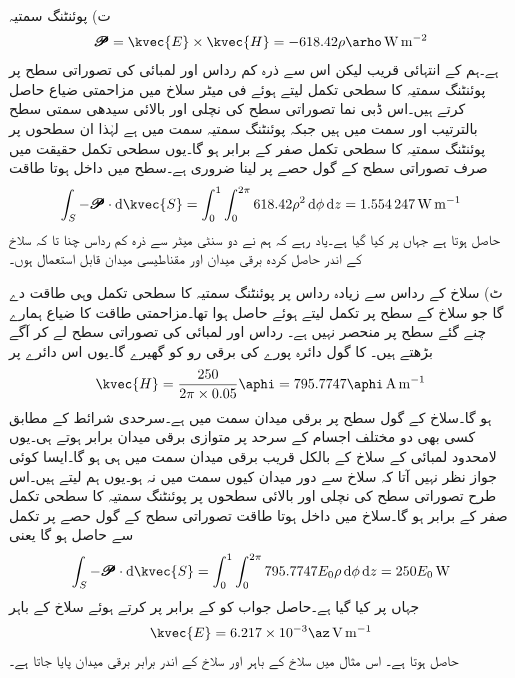 ت) پوئنٹنگ سمتیہ
\begin{align*}
\pmb{\mathscr{P}}=\kvec{E} \times \kvec{H}=-618.42 \rho \arho \, \si{\watt\per\meter\squared}
\end{align*}
 ہے۔ہم  کے انتہائی قریب لیکن اس سے ذرہ کم رداس اور  لمبائی کی تصوراتی سطح پر پوئنٹنگ سمتیہ کا سطحی تکمل لیتے ہوئے فی میٹر سلاخ میں مزاحمتی ضیاع حاصل کرتے ہیں۔اس ڈبی نما تصوراتی سطح کی نچلی اور بالائی سیدھی سمتی سطح بالترتیب  اور  سمت میں ہیں جبکہ پوئنٹنگ سمتیہ  سمت میں ہے لہٰذا ان سطحوں پر پوئنٹنگ سمتیہ  کا سطحی تکمل صفر کے برابر ہو گا۔یوں سطحی تکمل حقیقت میں صرف تصوراتی سطح کے گول حصے پر لینا ضروری ہے۔سطح میں داخل ہوتا طاقت 
\begin{align*}
\int_S -\pmb{\mathscr{P}} \cdot \dif \kvec{S} =\int_{0}^{1} \int_{0}^{2\pi} 618.42 \rho^2 \dif \phi \dif z=\SI{1.554247}{\watt\per\meter}
\end{align*}
حاصل ہوتا ہے جہاں  پر کیا گیا ہے۔یاد رہے کہ ہم نے دو سنٹی میٹر سے ذرہ کم رداس چنا تا کہ سلاخ کے اندر حاصل کردہ برقی میدان اور مقناطیسی میدان قابل استعمال ہوں۔

ٹ) سلاخ کے رداس سے زیادہ رداس پر پوئنٹنگ سمتیہ کا سطحی تکمل وہی طاقت دے گا جو سلاخ کے سطح پر تکمل لیتے ہوئے حاصل ہوا تھا۔مزاحمتی طاقت کا ضیاع ہمارے چنے گئے سطح پر منحصر نہیں ہے۔  رداس اور  لمبائی کی تصوراتی سطح لے کر آگے بڑھتے ہیں۔ کا گول دائرہ پورے  کی برقی رو کو گھیرے گا۔یوں اس دائرے پر 
\begin{align*}
\kvec{H}=\frac{250}{2\pi \times 0.05} \aphi=795.7747 \aphi \, \si{\ampere\per\meter}
\end{align*}
ہو گا۔سلاخ کے گول سطح پر برقی میدان  سمت میں ہے۔سرحدی شرائط کے مطابق کسی بھی دو مختلف اجسام کے سرحد پر متوازی برقی میدان برابر ہوتے ہی۔یوں لامحدود لمبائی کے سلاخ کے بالکل قریب برقی میدان  سمت میں ہی ہو گا۔ایسا کوئی جواز نظر نہیں آتا کہ سلاخ سے دور میدان کیوں  سمت میں نہ ہو۔یوں ہم  لیتے ہیں۔اس طرح تصوراتی سطح کی نچلی اور بالائی سطحوں پر پوئنٹنگ سمتیہ کا سطحی تکمل صفر کے برابر ہو گا۔سلاخ میں داخل ہوتا طاقت  تصوراتی سطح کے گول حصے پر تکمل سے حاصل ہو گا یعنی
 \begin{align*}
\int_S -\pmb{\mathscr{P}} \cdot \dif \kvec{S} =\int_{0}^{1} \int_{0}^{2\pi} 795.7747 E_0 \rho \dif \phi \dif z=250 E_0 \, \si{\watt}
\end{align*}
جہاں  پر کیا گیا ہے۔حاصل جواب کو  کے برابر پر کرتے ہوئے سلاخ کے باہر
\begin{align*}
\kvec{E}=6.217 \times 10^{-3} \az \, \si{\volt\per\meter}
\end{align*}
حاصل ہوتا ہے۔ اس مثال میں سلاخ کے باہر اور سلاخ کے اندر برابر برقی میدان پایا جاتا ہے۔

